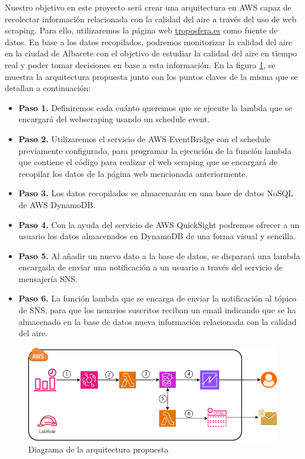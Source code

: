 \documentclass[12pt,a4paper]{report}
\begin{document}
Nuestro objetivo en este proyecto será crear una arquitectura en AWS capaz de recolectar información relacionada con la
calidad del aire a través del uso de web scraping. Para ello, utilizaremos la página web \href{https://troposfera.es/datos/dev-albacete/#/dashboard}{troposfera.es} como fuente de datos.
En base a los datos recopilados, podremos monitorizar la calidad del aire en la ciudad de Albacete con el objetivo
de estudiar la calidad del aire en tiempo real y poder tomar decisiones en base a esta información.
\newline
En la figura \ref{fig:diagrama}, se muestra la arquitectura propuesta junto con los puntos claves de la misma que se detallan a continuación:
\begin{itemize}%
    \item \textbf{Paso 1.} Definiremos cada cuánto queremos que se ejecute la lambda que se encargará del webscraping usando un schedule event.
    \item \textbf{Paso 2.} Utilizaremos el servicio de AWS EventBridge con el schedule previamente configurado, para programar la ejecución de la función lambda que contiene el código para realizar el web scraping que se encargará de recopilar los datos de la página web mencionada anteriormente.
    \item \textbf{Paso 3.} Los datos recopilados se almacenarán en una base de datos NoSQL de AWS DynamoDB.
    \item \textbf{Paso 4.} Con la ayuda del servicio de AWS QuickSight podremos ofrecer a un usuario los datos almacenados en DynamoDB de una forma visual y sencilla.
    \item \textbf{Paso 5.} Al añadir un nuevo dato a la base de datos, se disparará una lambda encargada de enviar una notificación a un usuario a través del servicio de mensajería SNS.
    \item \textbf{Paso 6.} La función lambda que se encarga de enviar la notificación al tópico de SNS, para que los usuarios suscritos reciban un email indicando que se ha almacenado en la base de datos
    nueva información relacionada con la calidad del aire.
\end{itemize}

\begin{figure}[H]
    \centering
    \includegraphics[width=1\textwidth]{diagrama.png}
    \caption{Diagrama de la arquitectura propuesta}
    \label{fig:diagrama}
\end{figure}
\end{document}
